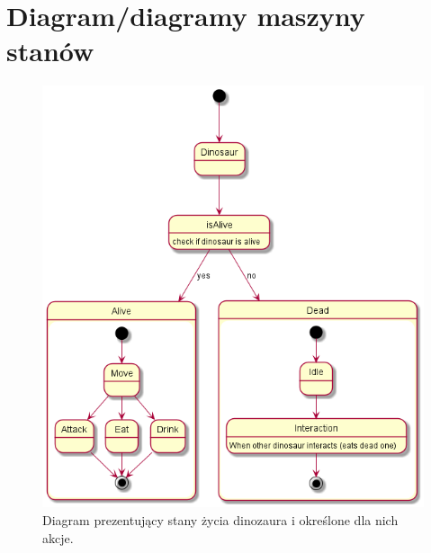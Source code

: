 \newpage
\newpage
\section{Diagram/diagramy maszyny stanów}

\begin{figure}[h!]
    \centering
    \includegraphics[scale=0.65]{images/state/state_alive.png}
    \caption{Diagram prezentujący stany życia dinozaura i określone dla nich akcje.}
    \label{fig:stalive}
\end{figure}
\newpage

